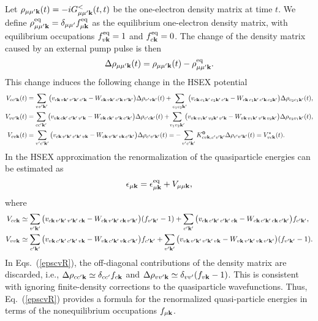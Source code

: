 \documentclass[twocolumn,aps,a4paper,superscriptaddress]{revtex4-2}
\begin{document}
\begin{widetext}
Let $\rho_{\mu\mu'{\mathbf k}}(t)=-iG_{\mu\mu'{\mathbf k}}^{<}(t,t)$ be the one-electron
density matrix at time $t$. We define
$\rho^{\rm eq}_{\mu\mu'{\mathbf k}}=\delta_{\mu\mu'}f^{\rm eq}_{\mu{\mathbf k}}$ as the
equilibrium one-electron  density matrix, with equilibrium occupations $f^{\rm
eq}_{v{\mathbf k}}=1$ and $f^{\rm eq}_{c{\mathbf k}}=0$. The change of the density
matrix  caused by an external pump pulse is then
\begin{align}
\Delta\rho_{\mu\mu'{\mathbf k}}(t)=\rho_{\mu\mu'{\mathbf k}}(t)-\rho^{\rm eq}_{\mu\mu'{\mathbf k}}.
\end{align}
This change induces the following change in the HSEX potential
\begin{subequations}
\begin{align}
V_{cc'{\mathbf k}}(t)&=\sum_{vv'{\mathbf k}'}\big(
v_{c{\mathbf k}\, v{\mathbf k}'\, v'{\mathbf k}' \,c'{\mathbf k}}-W_{c{\mathbf k}\, v{\mathbf k}'\,  c'{\mathbf k}\, v'{\mathbf k}'}
\big)\Delta\rho_{v'v{\mathbf k}'}(t)
+\sum_{c_{1}c_{2}{\mathbf k}'}\big(
v_{c{\mathbf k}\, c_{1}{\mathbf k}'\, c_{2}{\mathbf k}' \,c'{\mathbf k}}-W_{c{\mathbf k}\, c_{1}{\mathbf k}'\,
c'{\mathbf k}\, c_{2}{\mathbf k}'}
\big)\Delta\rho_{c_{2}c_{1}{\mathbf k}'}(t),
\\
V_{vv'{\mathbf k}}(t)&=\sum_{cc'{\mathbf k}'}\big(
v_{v{\mathbf k}\, c{\mathbf k}'\, c'{\mathbf k}'\, v'{\mathbf k}}-W_{v{\mathbf k}\, c{\mathbf k}'\,  v'{\mathbf k}\, c'{\mathbf k}'}
\big)\Delta\rho_{c'c{\mathbf k}'}(t)
+\!\sum_{v_{1}v_{2}{\mathbf k}'}\!\big(
v_{v{\mathbf k}\, v_{1}{\mathbf k}'\, v_{2}{\mathbf k}'\, v'{\mathbf k}}-W_{v{\mathbf k}\, v_{1}{\mathbf k}'\,
v'{\mathbf k}\, v_{2}{\mathbf k}'}
\big)\Delta\rho_{v_{2}v_{1}{\mathbf k}'}(t),
\\
V_{cv{\mathbf k}}(t)&=\sum_{v'c'{\mathbf k}'}\big(
v_{c{\mathbf k}\, v'{\mathbf k}'\, c'{\mathbf k}'\, v{\mathbf k}}-W_{c{\mathbf k}\, v'{\mathbf k}'\,  v{\mathbf k}\, c'{\mathbf k}'}
\big)\Delta\rho_{c'v'{\mathbf k}'}(t)
=-\sum_{v'c'{\mathbf k}'}K^{\mathbf 0}_{cv{\mathbf k},c'v'{\mathbf k}'}\Delta\rho_{c'v'{\mathbf k}'}(t)
=V_{vc{\mathbf k}}^{\ast}(t).
\label{hsexpotcv}
\end{align}
\label{hsexpot}
\end{subequations}
In the HSEX approximation the renormalization of the quasiparticle
energies can be estimated as
\begin{align}
\epsilon_{\mu{\mathbf k}}=\epsilon^{\rm eq}_{\mu{\mathbf k}}+V_{\mu\mu{\mathbf k}},
\label{rqpene}
\end{align}
where
\begin{subequations}
\begin{align}
V_{cc{\mathbf k}}&\simeq \sum_{v'{\mathbf k}'}\big(
v_{c{\mathbf k}\, v'{\mathbf k}'\, v'{\mathbf k}' \,c{\mathbf k}}-W_{c{\mathbf k}\, v'{\mathbf k}'\,  c{\mathbf k}\, v'{\mathbf k}'}
\big)(f_{v'{\mathbf k}'}-1)+\sum_{c'{\mathbf k}'}\big(
v_{c{\mathbf k}\, c'{\mathbf k}'\, c'{\mathbf k}' \,c{\mathbf k}}-W_{c{\mathbf k}\, c'{\mathbf k}'\,
c{\mathbf k}\, c'{\mathbf k}'}
\big)f_{c'{\mathbf k}'},
\label{epscR}
\\
V_{vv{\mathbf k}}&\simeq \sum_{c'{\mathbf k}'}\big(
v_{v{\mathbf k}\, c'{\mathbf k}'\, c'{\mathbf k}'\, v{\mathbf k}}-W_{v{\mathbf k}\, c'{\mathbf k}'\,  v{\mathbf k}\, c'{\mathbf k}'}
\big)f_{c'{\mathbf k}'}
+\sum_{v'{\mathbf k}'}\big(
v_{v{\mathbf k}\, v'{\mathbf k}'\, v'{\mathbf k}'\, v{\mathbf k}}-W_{v{\mathbf k}\, v'{\mathbf k}'\,
v{\mathbf k}\, v'{\mathbf k}'}\big)(f_{v'{\mathbf k}'}-1).
\label{epsvR}
\end{align}
\label{epscvR}
\end{subequations}
In Eqs.~(\ref{epscvR}), the off-diagonal contributions of the density
matrix are discarded, i.e.,
$\Delta\rho_{cc'{\mathbf k}}\simeq \delta_{cc'}f_{c{\mathbf k}}$ and
$\Delta \rho_{vv'{\mathbf k}}\simeq \delta_{vv'}(f_{v{\mathbf k}}-1)$.
This is consistent with ignoring
finite-density corrections to the
quasiparticle wavefunctions. Thus, Eq.~(\ref{epscvR}) provides a
formula for the renormalized quasi-particle
energies in terms of the nonequilibrium occupations $f_{\mu{\mathbf k}}$.


\end{widetext}
\end{document}
